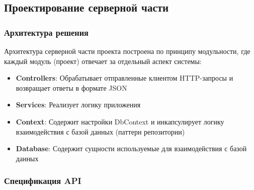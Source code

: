 \subsection{Проектирование серверной части}

\subsubsection{Архитектура решения}

Архитектура серверной части проекта построена по принципу модульности, где каждый модуль (проект) отвечает за отдельный аспект системы:

\begin{itemize}
	\item{\textbf{Controllers}: Обрабатывает отправленные клиентом HTTP-запросы и возвращает ответы в формате JSON}
	\item{\textbf{Services}: Реализует логику приложения}
	\item{\textbf{Context}: Содержит настройки DbContext и инкапсулирует логику взаимодействия с базой данных (паттерн репозитории)}	
	\item{\textbf{Database}: Содержит сущности используемые для взаимодействия с базой данных}
\end{itemize}

\subsubsection{Спецификация API}


